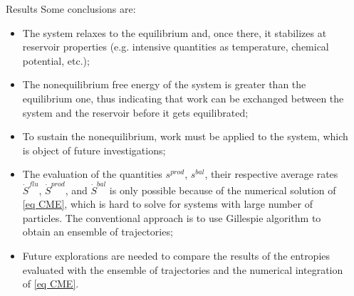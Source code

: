 \documentclass[final]{beamer}
\newlength{\sepwidth}
\newlength{\colwidth}
\newcommand{\separatorcolumn}{\begin{column}{\sepwidth}\end{column}}
\begin{document}
\begin{frame}[t]
\begin{columns}[t]
\begin{column}{\colwidth}
\begin{block}{Results}
Some conclusions are:
%
\begin{itemize}
\justifying
\item The system relaxes to the equilibrium and, once there, it stabilizes at reservoir properties (e.g. intensive quantities as temperature, chemical potential, etc.);
\item The nonequilibrium free energy of the system is greater than the equilibrium one, thus indicating that work can be exchanged between the system and the reservoir before it gets equilibrated;
\item To sustain the nonequilibrium, work must be applied to the system, which is object of future investigations;
\item The evaluation of the quantities $s^{prod}$, $s^{bal}$, their respective average rates $\dot{S}^{flu}$, $\dot{S}^{prod}$, and $\dot{S}^{bal}$ is only possible because of the numerical solution of \eqref{eq CME}, which is hard to solve for systems with large number of particles. The conventional approach is to use Gillespie algorithm to obtain an ensemble of trajectories;
\item Future explorations are needed to compare the results of the entropies evaluated with the ensemble of trajectories and the numerical integration of \eqref{eq CME}.
\end{itemize}


\end{block}
\end{column}

\separatorcolumn
\end{columns}
 \end{frame}
\end{document}
